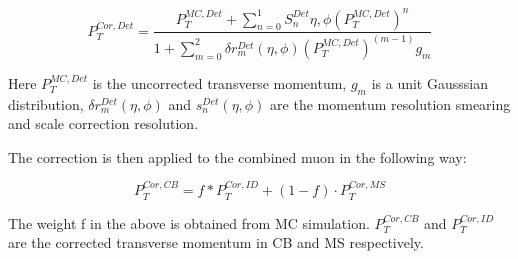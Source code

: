 
\begin{equation}
P_{T}^{Cor,Det} = \frac{P^{MC, Det}_{T} + \sum_{n=0}^{1} S_{n}^{Det}{\eta, \phi}(P_{T}^{MC, Det})^n}{1+\sum_{m=0}^{2}\delta r_{m}^{Det}(\eta, \phi)(P_{T}^{MC, Det})^(m-1) g_{m}}
\label{eq:muoncalib}
\end{equation}

Here $P_{T}^{MC, Det}$ is the uncorrected transverse momentum, $g_m$ is a unit Gausssian distribution, $\delta r^{Det}_{m}(\eta, \phi)$ and $s_{n}^{Det}(\eta, \phi)$ are the momentum resolution smearing and scale correction resolution. 

The correction is then applied to the combined muon in the following way:

\begin{equation}
P_{T}^{Cor, CB} = f *P_{T}^{Cor, ID}+ (1-f) \cdot P_{T}^{Cor, MS}
\label{eq:muoncalibfactor}
\end{equation}

The weight f in the above is obtained from MC simulation. $P_T^{Cor, CB}$ and $P_T^{Cor,ID}$ are the corrected transverse momentum in CB and MS respectively.






%
%
%
%
%
%

